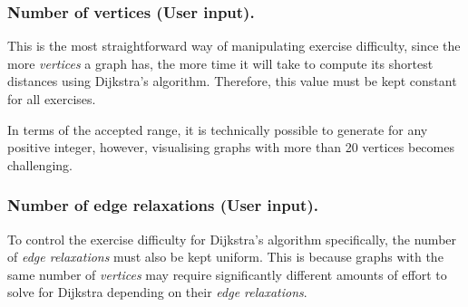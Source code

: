 \documentclass{l4proj}
\begin{document}
\subsubsection{Number of vertices (User input).}
\label{sec:nov}

This is the most straightforward way of manipulating exercise difficulty, since the more \emph{vertices} a graph has, the more time it will take to compute its shortest distances using Dijkstra's algorithm. Therefore, this value must be kept constant for all exercises. 

In terms of the accepted range, it is technically possible to generate for any positive integer, however, visualising graphs with more than 20 vertices becomes challenging.

\subsubsection{Number of edge relaxations (User input).}
\label{sec:ernum}

To control the exercise difficulty for Dijkstra's algorithm specifically, the number of \emph{edge relaxations} must also be kept uniform. This is because graphs with the same number of \emph{vertices} may require significantly different amounts of effort to solve for Dijkstra depending on their \emph{edge relaxations}. 
\end{document}

